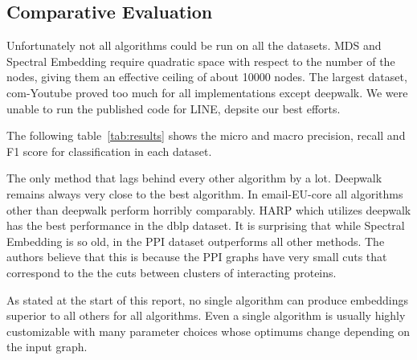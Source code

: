 \subsection{Comparative Evaluation}

Unfortunately not all algorithms could be run on all the datasets. MDS and Spectral Embedding
require quadratic space with respect to the number of the nodes, giving them an effective ceiling of
about 10000 nodes. The largest dataset, com-Youtube proved too much for all implementations except
deepwalk. We were unable to run the published code for LINE, depsite our best efforts.

The following table~\ref{tab:results} shows the micro and macro precision, recall and F1 score for
classification in each dataset.



The only method that lags behind every other algorithm by a lot. Deepwalk remains always very close
to the best algorithm. In email-EU-core all algorithms other than deepwalk perform horribly
comparably. HARP which utilizes deepwalk has the best performance in the dblp dataset. It is
surprising that while Spectral Embedding is so old, in the PPI dataset outperforms all other
methods. The authors believe that this is because the PPI graphs have very small cuts that
correspond to the the cuts between clusters of interacting proteins.

As stated at the start of this report, no single algorithm can produce embeddings superior to all
others for all algorithms. Even a single algorithm is usually highly customizable with many
parameter choices whose optimums change depending on the input graph.


